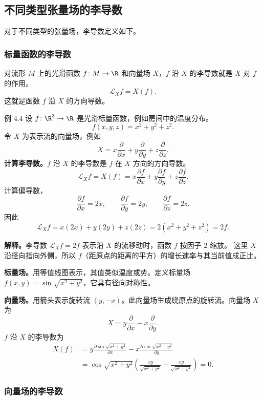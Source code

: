 \subsection{不同类型张量场的李导数}
对于不同类型的张量场，李导数定义如下。

\subsubsection{标量函数的李导数}
对流形 $M$ 上的光滑函数 $f\colon M\to\R$ 和向量场 $X$，$f$ 沿 $X$ 的李导数就是 $X$ 对 $f$ 的作用。
\[
  \mathcal L_X f=X(f).
\]
这就是函数 $f$ 沿 $X$ 的方向导数。

\begin{statement}{例 4.4}{}
设 $f\colon\R^3\to\R$ 是光滑标量函数，例如房间中的温度分布。
\[
  f(x,y,z)=x^2+y^2+z^2.
\]
令 $X$ 为表示流的向量场，例如
\[
  X=x\frac{\partial}{\partial x}
    +y\frac{\partial}{\partial y}
    +z\frac{\partial}{\partial z}.
\]
\textbf{计算李导数。}$f$ 沿 $X$ 的李导数是 $f$ 在 $X$ 方向的方向导数。
\[
  \mathcal L_X f=X(f)=x\frac{\partial f}{\partial x}
              +y\frac{\partial f}{\partial y}
              +z\frac{\partial f}{\partial z}.
\]
计算偏导数，
\[
  \frac{\partial f}{\partial x}=2x,\qquad
  \frac{\partial f}{\partial y}=2y,\qquad
  \frac{\partial f}{\partial z}=2z.
\]
因此
\[
  \mathcal L_X f=x(2x)+y(2y)+z(2z)=2(x^2+y^2+z^2)=2f.
\]

\textbf{解释。}李导数 $\mathcal L_X f=2f$ 表示沿 $X$ 的流移动时，函数 $f$ 按因子 $2$ 缩放。
这里 $X$ 沿径向指向外侧，所以 $f$（距原点的距离的平方）的增长速率与其当前值成正比。

\textbf{标量场。}用等值线图表示，其值类似温度或势。定义标量场 $f(x,y)=\sin\sqrt{x^2+y^2}$，它具有径向对称性。

\textbf{向量场。}用箭头表示旋转流 $(y,-x)$。此向量场生成绕原点的旋转流。向量场 $X$ 为
\[
  X=y\frac{\partial}{\partial x}-x\frac{\partial}{\partial y}.
\]
$f$ 沿 $X$ 的李导数为
\[
  \begin{aligned}
    X(f)
      &=y\frac{\partial\sin\sqrt{x^2+y^2}}{\partial x}
        -x\frac{\partial\sin\sqrt{x^2+y^2}}{\partial y}\\
      &=\cos\sqrt{x^2+y^2}
        \left(\frac{xy}{\sqrt{x^2+y^2}}-\frac{xy}{\sqrt{x^2+y^2}}\right)=0.
  \end{aligned}
\]
\end{statement}

\subsubsection{向量场的李导数}
